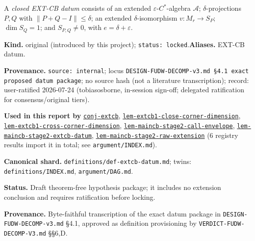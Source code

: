 \hypertarget{def:extcb-datum}{}%
\begin{definition}\label{def:extcb-datum}
A \emph{closed EXT-CB datum} consists of an extended
\(\varepsilon\)-\(C^*\)-algebra \(\mathcal A\); \(\delta\)-projections
\(P,Q\) with \(\lVert P+Q-I\rVert\le\delta\); an extended
\(\delta\)-isomorphism \(v:M_r\to S_P\); \(\dim S_Q=1\); and
\(S_{P,Q}\ne0\), with \(e=\delta+\varepsilon\).
\end{definition}
\begin{defnote}
\textbf{Kind.} original (introduced by this project); \texttt{status: locked}.\quad\textbf{Aliases.} EXT-CB datum.
\par
\textbf{Provenance.} \texttt{source: internal}; locus \texttt{DESIGN-\allowbreak{}FUDW-\allowbreak{}DECOMP-\allowbreak{}v3.\allowbreak{}md \S{}4.\allowbreak{}1 exact proposed datum package}; no source hash (not a literature transcription); record: user-\allowbreak{}ratified 2026-\allowbreak{}07-\allowbreak{}24 (tobiasosborne,\allowbreak{} in-\allowbreak{}session sign-\allowbreak{}off;\allowbreak{} delegated ratification for consensus/\allowbreak{}original tiers).
\par
\textbf{Used in this report by} \hyperref[conj:extcb]{\texttt{conj-\allowbreak{}extcb}}, \hyperref[lem:extcb1-close-corner-dimension]{\texttt{lem-\allowbreak{}extcb1-\allowbreak{}close-\allowbreak{}corner-\allowbreak{}dimension}}, \hyperref[lem:extcb1-cross-corner-dimension]{\texttt{lem-\allowbreak{}extcb1-\allowbreak{}cross-\allowbreak{}corner-\allowbreak{}dimension}}, \hyperref[lem:maincb-stage2-call-envelope]{\texttt{lem-\allowbreak{}maincb-\allowbreak{}stage2-\allowbreak{}call-\allowbreak{}envelope}}, \hyperref[lem:maincb-stage2-extcb-datum]{\texttt{lem-\allowbreak{}maincb-\allowbreak{}stage2-\allowbreak{}extcb-\allowbreak{}datum}}, \hyperref[lem:maincb-stage2-raw-extension]{\texttt{lem-\allowbreak{}maincb-\allowbreak{}stage2-\allowbreak{}raw-\allowbreak{}extension}} (6 registry results import it in total; see \texttt{argument/INDEX.md}).
\par
\textbf{Canonical shard.} \texttt{definitions/\allowbreak{}def-\allowbreak{}extcb-\allowbreak{}datum.\allowbreak{}md}; twins: \texttt{definitions/INDEX.md}, \texttt{argument/DAG.md}.
\par
\textbf{Status.} Draft theorem-free hypothesis package; it includes no extension
conclusion and requires ratification before locking.

\textbf{Provenance.} Byte-faithful transcription of the exact datum package in
\texttt{DESIGN-\allowbreak{}FUDW-\allowbreak{}DECOMP-\allowbreak{}v3.\allowbreak{}md} \S{}4.1, approved as definition provisioning by
\texttt{VERDICT-\allowbreak{}FUDW-\allowbreak{}DECOMP-\allowbreak{}V3.\allowbreak{}md} \S{}\S{}6,D.
\end{defnote}

